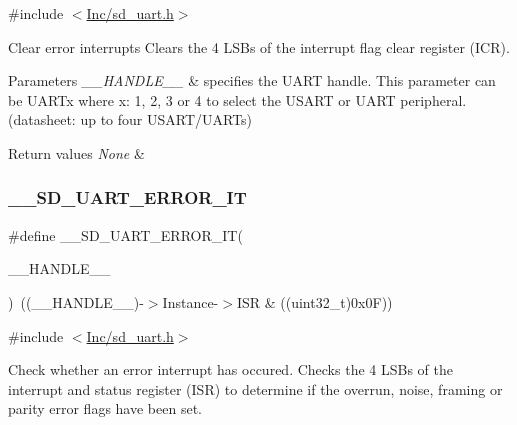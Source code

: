 {\ttfamily \#include $<$\mbox{\hyperlink{sd__uart_8h}{Inc/sd\+\_\+uart.\+h}}$>$}



Clear error interrupts Clears the 4 L\+S\+Bs of the interrupt flag clear register (I\+CR). 


\begin{DoxyParams}{Parameters}
{\em \+\_\+\+\_\+\+H\+A\+N\+D\+L\+E\+\_\+\+\_\+} & specifies the U\+A\+RT handle. This parameter can be U\+A\+R\+Tx where x\+: 1, 2, 3 or 4 to select the U\+S\+A\+RT or U\+A\+RT peripheral. (datasheet\+: up to four U\+S\+A\+R\+T/\+U\+A\+R\+Ts) \\
\hline
\end{DoxyParams}

\begin{DoxyRetVals}{Return values}
{\em None} & \\
\hline
\end{DoxyRetVals}
\mbox{\label{group___s_d___u_a_r_t___defines_gaecb6d035303fa5bf3942fdfa3f78867f}} 
\subsubsection{\texorpdfstring{\+\_\+\+\_\+\+S\+D\+\_\+\+U\+A\+R\+T\+\_\+\+E\+R\+R\+O\+R\+\_\+\+IT}{\_\_SD\_UART\_ERROR\_IT}}
{\footnotesize\ttfamily \#define \+\_\+\+\_\+\+S\+D\+\_\+\+U\+A\+R\+T\+\_\+\+E\+R\+R\+O\+R\+\_\+\+IT(\begin{DoxyParamCaption}\item[{}]{\+\_\+\+\_\+\+H\+A\+N\+D\+L\+E\+\_\+\+\_\+ }\end{DoxyParamCaption})~((\+\_\+\+\_\+\+H\+A\+N\+D\+L\+E\+\_\+\+\_\+)-\/$>$Instance-\/$>$I\+SR \& ((uint32\+\_\+t)0x0\+F))}



{\ttfamily \#include $<$\mbox{\hyperlink{sd__uart_8h}{Inc/sd\+\_\+uart.\+h}}$>$}



Check whether an error interrupt has occured. Checks the 4 L\+S\+Bs of the interrupt and status register (I\+SR) to determine if the overrun, noise, framing or parity error flags have been set. 


